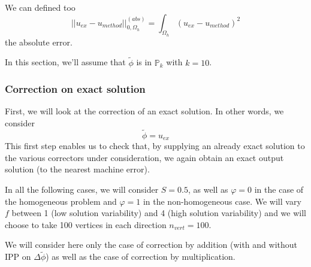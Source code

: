We can defined too
\begin{equation*}
	||u_{ex}-u_{method}||_{0,\Omega_h}^{(abs)}=\int_{\Omega_h} (u_{ex}-u_{method})^2
\end{equation*}
the absolute error.

In this section, we'll assume that $\tilde{\phi}$ is in $\mathbb{P}_k$ with $k=10$.

\subsubsection{Correction on exact solution} \label{Corr.results.ana}

First, we will look at the correction of an exact solution. In other words, we consider
\begin{equation*}
	\tilde{\phi}=u_{ex}
\end{equation*}
This first step enables us to check that, by supplying an already exact solution to the various correctors under consideration, we again obtain an exact output solution (to the nearest machine error).

In all the following cases, we will consider $S=0.5$, as well as $\varphi=0$ in the case of the homogeneous problem and $\varphi=1$ in the non-homogeneous case. We will vary $f$ between 1 (low solution variability) and 4 (high solution variability) and we will choose to take 100 vertices in each direction $n_{vert}=100$.

\begin{Rem}
	We will consider here only the case of correction by addition (with and without IPP on $\Delta\tilde{\phi}$) as well as the case of correction by multiplication.
\end{Rem}

